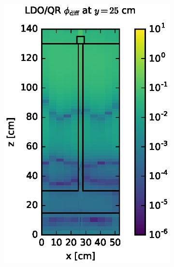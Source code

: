 \begin{figure}[!htb]
\centering
\begin{subfigure}{0.4\textwidth}
\includegraphics[max height=0.445\textheight]
{img/steel-plots/fwd/flux-diff-rel-qr04.eps}
\end{subfigure} ~
\begin{subfigure}{0.4\textwidth}

\end{subfigure}
\end{figure}
